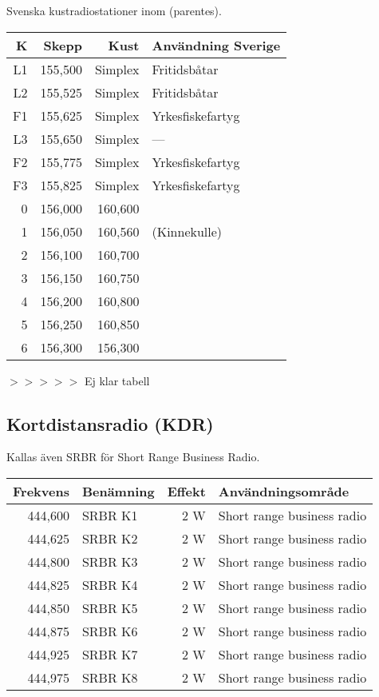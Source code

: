 Svenska kustradiostationer inom (parentes).

\begin{longtable}{rrrl}
	\textbf{K} & \textbf{Skepp} & \textbf{Kust} & \textbf{Användning Sverige} \\ \hline
	        L1 &        155,500 &       Simplex & Fritidsbåtar     \\
	        L2 &        155,525 &       Simplex & Fritidsbåtar     \\
	        F1 &        155,625 &       Simplex & Yrkesfiskefartyg \\
	        L3 &        155,650 &       Simplex & ---              \\
	        F2 &        155,775 &       Simplex & Yrkesfiskefartyg \\
	        F3 &        155,825 &       Simplex & Yrkesfiskefartyg \\
	         0 &        156,000 &       160,600 &  \\
	         1 &        156,050 &       160,560 & (Kinnekulle)     \\
	         2 &        156,100 &       160,700 &  \\
	         3 &        156,150 &       160,750 &\\
	         4 & 156,200 & 160,800 & \\
	         5 & 156,250 & 160,850 & \\
	         6 & 156,300 & 156,300 & \\
	         
\end{longtable}
$>>>>>$ Ej klar tabell

\subsection{Kortdistansradio (KDR)}

Kallas även SRBR för Short Range Business Radio.

\begin{tabular}{rlrl}
	\textbf{Frekvens} & \textbf{Benämning} & \textbf{Effekt} & \textbf{Användningsområde} \\ \hline
	          444,600 & SRBR K1            &             2 W & Short range business radio \\
	          444,625 & SRBR K2            &             2 W & Short range business radio \\
	          444,800 & SRBR K3            &             2 W & Short range business radio \\
	          444,825 & SRBR K4            &             2 W & Short range business radio \\
	          444,850 & SRBR K5            &             2 W & Short range business radio \\
	          444,875 & SRBR K6            &             2 W & Short range business radio \\
	          444,925 & SRBR K7            &             2 W & Short range business radio \\
	          444,975 & SRBR K8            &             2 W & Short range business radio
\end{tabular}

